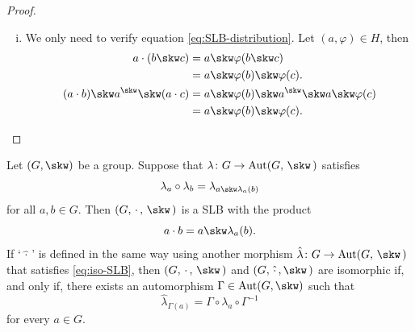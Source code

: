 \begin{proof}
\begin{enumerate}[a),font=\upshape]
\begin{enumerate}[i),font=\upshape]
\begin{enumerate}[-]
                \item \textit{identity:} Let $(a,\varphi)\in H$. Then,
                $$
                    a\cdot1=a\skw\varphi(1)=a\skw1=a.
                $$

                \item \textit{inverse:} Let $(a,\varphi)\in H$. Then
                $$
                    a\cdot\varphi^{-1}(a^\skw) = a\skw\varphi(\varphi^{-1}(a^\skw))=a\skw a^\skw=1.
                $$
            \end{enumerate}
            \item We only need to verify equation \eqref{eq:SLB-distribution}. Let $(a,\varphi)\in H$, then
            \begin{align*}
                a\cdot(b\skw c) &= a\skw\varphi(b\skw c)\\
                    &= a\skw\varphi(b)\skw\varphi(c).\\
                (a\cdot b)\skw a^\skw\skw (a\cdot c)
                    &= a\skw\varphi(b) \skw
                        a^\skw\skw a\skw\varphi(c)\\
                    &= a\skw\varphi(b)\skw\varphi(c).
            \end{align*}
        \end{enumerate}
    \end{enumerate}
\end{proof}

\begin{prop}\label{lem:iso-SLB}
    Let\/ $(G,\skw)$ be a group. Suppose that\/ $\lambda\colon G\to\Aut(G,\,\skw\,)$ satisfies
    \begin{equation}\label{eq:iso-SLB}
        \lambda_a\circ\lambda_b = \lambda_{a\skw\lambda_a(b)}
    \end{equation}
    for all\/ $a,b\in G$. Then\/ $(G,\,\cdot\,,\,\skw\,)$ is a SLB with the product
    \begin{equation}\label{eq:cdot-from-lambda}
        a\cdot b = a\skw\lambda_a(b).
    \end{equation}
    If\/ {\upshape`$\hat{\,\cdot\,}$'} is defined in the same way using another morphism\/ $\hat\lambda\colon G\to\Aut(G,\,\skw\,)$ that satisfies \eqref{eq:iso-SLB}, then\/ $(G,\,\cdot\,,\,\skw\,)$ and\/ $(G,\,\hat\cdot\,,\skw\,)$ are isomorphic if, and only if, there exists an automorphism\/ $\Gamma\in\Aut(G,\skw)$ such that 
    \begin{equation}\label{eq:iso-SLB-lambda}
        \hat\lambda_{\Gamma(a)}=\Gamma\circ\lambda_a\circ\Gamma^{-1}
    \end{equation}
    for every\/ $a\in G$.
\end{prop}

